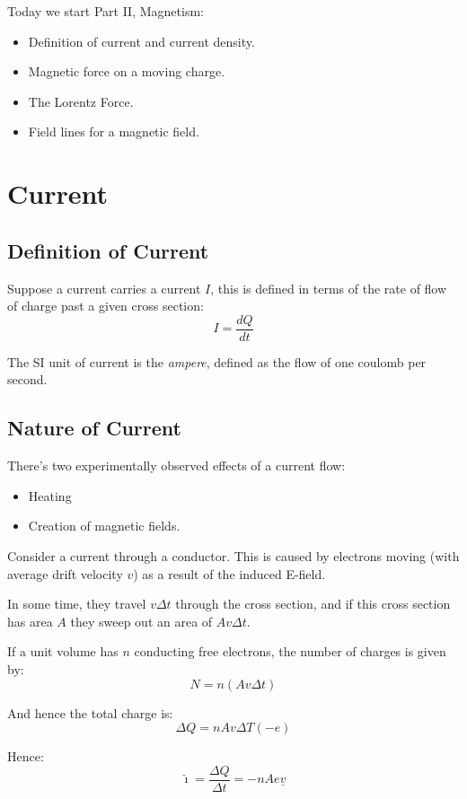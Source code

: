 
Today we start Part II, Magnetism:
\begin{itemize}
    \item Definition of current and current density.
    \item Magnetic force on a moving charge.
    \item The Lorentz Force.
    \item Field lines for a magnetic field.
\end{itemize}

\section{Current}
\subsection{Definition of Current}
Suppose a current carries a current $I$, this is defined in terms of the rate of flow of charge past a given cross section:
\[
    I = \frac{dQ}{dt}
\]

The SI unit of current is the \emph{ampere}, defined as the flow of one coulomb per second.

\subsection{Nature of Current}
There's two experimentally observed effects of a current flow:
\begin{itemize}
    \item Heating
    \item Creation of magnetic fields.
\end{itemize}

Consider a current through a conductor. This is caused by electrons moving (with average drift velocity $v$) as a result of the induced E-field.

In some time, they travel $v \Delta t$ through the cross section, and if this cross section has area $A$ they sweep out an area of $A v \Delta t$.

If a unit volume has $n$ conducting free electrons, the number of charges is given by:
\[
    N = n(A v \Delta t)
\]

And hence the total charge is:
\[
    \Delta Q = nAv \Delta T (-e)
\]

Hence:
\[
    \hat{\imath} = \frac{\Delta Q}{\Delta t} = -nA e \underline{v}
\]

